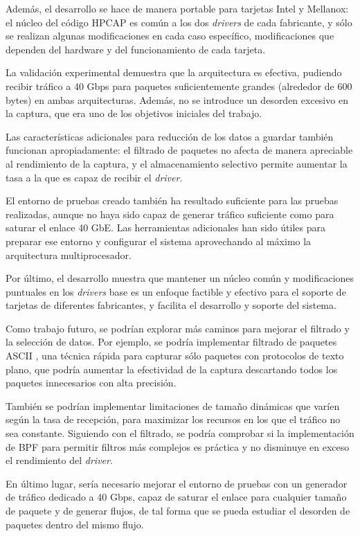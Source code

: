 \documentclass[twoside, 12pt]{epstfg}
\begin{document}
Además, el desarrollo se hace de manera portable para tarjetas Intel y Mellanox: el núcleo del código HPCAP es común a los dos \textit{drivers} de cada fabricante, y sólo se realizan algunas modificaciones en cada caso específico, modificaciones que dependen del hardware y del funcionamiento de cada tarjeta.

La validación experimental demuestra que la arquitectura es efectiva, pudiendo recibir tráfico a 40 Gbps para paquetes suficientemente grandes (alrededor de 600 bytes) en ambas arquitecturas. Además, no se introduce un desorden excesivo en la captura, que era uno de los objetivos iniciales del trabajo.

Las características adicionales para reducción de los datos a guardar también funcionan apropiadamente: el filtrado de paquetes no afecta de manera apreciable al rendimiento de la captura, y el almacenamiento selectivo permite aumentar la tasa a la que es capaz de recibir el \textit{driver}.

El entorno de pruebas creado también ha resultado suficiente para las pruebas realizadas, aunque no haya sido capaz de generar tráfico suficiente como para saturar el enlace 40 GbE. Las herramientas adicionales han sido útiles para preparar ese entorno y configurar el sistema aprovechando al máximo la arquitectura multiprocesador.

Por último, el desarrollo muestra que mantener un núcleo común y modificaciones puntuales en los \textit{drivers} base es un enfoque factible y efectivo para el soporte de tarjetas de diferentes fabricantes, y facilita el desarrollo y soporte del sistema.

Como trabajo futuro, se podrían explorar más caminos para mejorar el filtrado y la selección de datos. Por ejemplo, se podría implementar filtrado de paquetes ASCII \cite{ucedaselective}, una técnica rápida para capturar sólo paquetes con protocolos de texto plano, que podría aumentar la efectividad de la captura descartando todos los paquetes innecesarios con alta precisión.

También se podrían implementar limitaciones de tamaño dinámicas que varíen según la tasa de recepción, para maximizar los recursos en los que el tráfico no sea constante. Siguiendo con el filtrado, se podría comprobar si la implementación de \gls{BPF} para permitir filtros más complejos es práctica y no disminuye en exceso el rendimiento del \textit{driver}.

En último lugar, sería necesario mejorar el entorno de pruebas con un generador de tráfico dedicado a 40 Gbps, capaz de saturar el enlace para cualquier tamaño de paquete y de generar flujos, de tal forma que se pueda estudiar el desorden de paquetes dentro del mismo flujo.

\backmatter
\appendix

\cleardoublepage

\nocite{*}
{}

\cleardoublepage
\printindex
\end{document}
